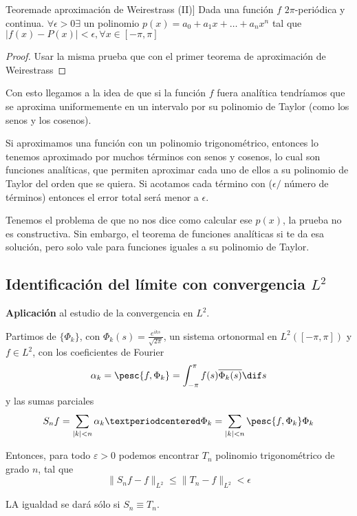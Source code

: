 		\begin{theorem}Teorema\IS de aproximación de Weirestrass (II)]
		Dada una función $f$ $2\pi$-periódica y continua. $\forall \epsilon > 0 \exists$ un polinomio $p(x)= a_0 + a_1 x + … + a_n x^n $ tal que $|f(x)-P(x)| < \epsilon, \forall x \in [-\pi,\pi]$
		\end{theorem}

		\begin{proof}
			Usar la misma prueba que con el primer teorema de aproximación de Weirestrass
		\end{proof}

		Con esto llegamos a la idea de que si la función $f$ fuera analítica tendríamos que se aproxima uniformemente en un intervalo por su polinomio de Taylor (como los senos y los cosenos).

		Si aproximamos una función con un polinomio trigonométrico, entonces lo tenemos aproximado por muchos términos con senos y cosenos, lo cual son funciones analíticas, que permiten aproximar cada uno de ellos a su polinomio de Taylor del orden que se quiera. Si acotamos cada término con ($\epsilon / $ número de términos) entonces el error total será menor a $\epsilon$.

		Tenemos el problema de que no nos dice como calcular ese $p(x)$, la prueba no es constructiva. Sin embargo, el teorema de funciones analíticas si te da esa solución, pero solo vale para funciones iguales a su polinomio de Taylor.

		\subsection{Identificación del límite con convergencia $L^2$}
		\textbf{Aplicación} al estudio de la convergencia en $L^2$.

		\begin{theorem}
			Partimos de $\{\Phi_k\}$, con $\Phi_k(s) = \frac{e^{iks}}{\sqrt{2\pi}}$, un sistema ortonormal en $L^2([-\pi,\pi])$ y $f \in L^2$, con los coeficientes de Fourier
			\[\alpha_k = \pesc{f, \Phi_{k}} = \int_{-\pi}^\pi f(s) \overline{\Phi_k(s)} \dif s  \] y las sumas parciales
			\[  S_n f = \sum_{|k| < n} \alpha_k · \Phi_k = \sum_{|k| < n}\pesc{f, \Phi_k} \Phi_k \]

			Entonces, para todo $ε > 0$ podemos encontrar $T_n$ polinomio trigonométrico de grado $n$, tal que
			\[ \| S_n f - f\|_{L^2} \leq \| T_n - f \|_{L^2} < \epsilon \]

			LA igualdad se dará sólo si $S_n \equiv T_n$.

		\end{theorem}

